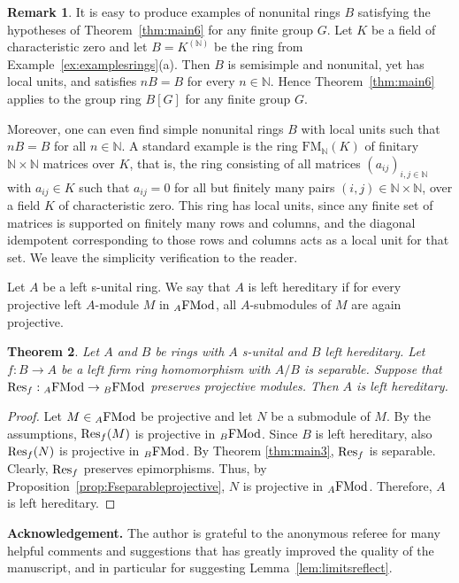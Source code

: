 \documentclass[12pt]{amsart}
\newtheorem{thm}{Theorem}
\theoremstyle{definition}
\newtheorem{rem}[thm]{Remark}
\newcommand{\N}{\mathbb{N}}
\newcommand{\FMod}{{\rm FMod}}
\newcommand{\Res}{{\rm Res}}
\begin{document}
\begin{rem}
It is easy to produce examples of nonunital rings \(B\) 
satisfying the hypotheses of
Theorem~\ref{thm:main6} for any finite group \(G\).
Let \(K\) be a field of characteristic zero and let
\(B = K^{(\N)}\) be the ring from Example~\ref{ex:examplesrings}(a).
Then \(B\) is semisimple and nonunital, 
yet has local units, and satisfies
\(nB = B\) for every \(n \in \N\).
Hence Theorem~\ref{thm:main6} applies to the group ring \(B[G]\) for any finite group \(G\).

Moreover, one can even find simple nonunital rings
$B$ with local units such that 
\(nB = B\) for all \(n \in \N\).
A standard example is the ring 
$\mathrm{FM}_{\N}(K)$ of finitary $\N \times \N$ matrices over $K$, that is, the ring consisting of all matrices $(a_{ij})_{i,j \in \N}$ with $a_{ij} \in K$ such that $a_{ij}=0$ for all but finitely many pairs $(i,j) \in \N \times \N$, over 
a field $K$ of characteristic zero.
This ring has local units, since any finite set of 
matrices is supported on finitely many rows and columns, 
and the diagonal idempotent corresponding to those rows 
and columns acts as a local unit for that set.
We leave the simplicity
verification to the reader.
\end{rem}

Let $A$ be a left s-unital ring.
We say that $A$ is  
left hereditary if for every 
projective left $A$-module $M$ in
${}_A\FMod$, all $A$-submodules of $M$ 
are again projective.

\begin{thm}\label{thm:ABhereditary}
Let $A$ and $B$ be rings with $A$ s-unital and
$B$ left hereditary.
Let $f : B \to A$ be a left firm 
ring homomorphism with $A/B$ is separable.
Suppose that 
$\Res_f : {}_A \FMod \to {}_B \FMod$ 
preserves projective modules. 
Then $A$ is left hereditary.
\end{thm}

\begin{proof}
Let $M \in {}_A \FMod$ be projective and
let $N$ be a submodule of $M$.
By the assumptions,
$\Res_f(M)$ is projective in  ${}_B \FMod$.
Since $B$ is left hereditary, also
$\Res_f(N)$ is projective in  ${}_B \FMod$.
By Theorem \ref{thm:main3},
$\Res_f$ is separable.
Clearly, $\Res_f$ preserves epimorphisms. 
Thus, by 
Proposition~\ref{prop:Fseparableprojective},
$N$ is projective in ${}_A \FMod$.
Therefore, $A$ is left hereditary. 
\end{proof}

\noindent
\textbf{Acknowledgement.}
The author is grateful to the anonymous referee for many
 helpful comments and suggestions that has greatly improved the quality of the manuscript, and in particular for suggesting Lemma~\ref{lem:limitsreflect}.
\end{document}
